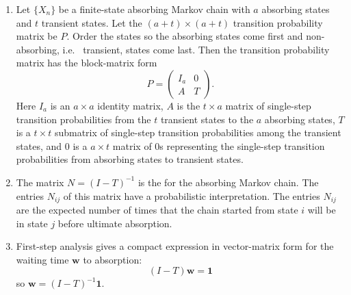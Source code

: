 \documentclass[12pt]{article}
\begin{document}
\begin{enumerate}
    \item
        Let \( \{ X_n \} \) be a finite-state absorbing Markov chain
        with \( a \) absorbing states and \( t \) transient states.  Let
        the \( (a + t) \times (a + t) \) transition probability matrix
        be \( P \).  Order the states so the absorbing states come first
        and non-absorbing, i.e.\ %
        transient, states come last. Then the transition probability
        matrix has the block-matrix form
        \[
            P =
            \begin{pmatrix}
                I_a & 0 \\
                A & T
            \end{pmatrix}
            .
        \] Here \( I_{a} \) is an \( a \times a \) identity matrix, \( A
        \) is the \( t \times a \) matrix of single-step transition
        probabilities from the \( t \) transient states to the \( a \)
        absorbing states, \( T \) is a \( t \times t \) submatrix of
        single-step transition probabilities among the transient states,
        and \( 0 \) is a \( a \times t \) matrix of \( 0 \)s
        representing the single-step transition probabilities from
        absorbing states to transient states.
    \item
        The matrix \( N = (I-T)^{-1} \) is the %
        for the absorbing Markov chain.  The entries \( N_{ij} \) of
        this matrix have a probabilistic interpretation.  The entries \(
        N_{ij} \) are the expected number of times that the chain
        started from state \( i \) will be in state \( j \) before
        ultimate absorption.
    \item
        First-step analysis gives a compact expression in vector-matrix
        form for the waiting time \( \mathbf{w} \) to absorption:
        \[
            (I - T) \mathbf{w} = \mathbf{1}
        \] so \( \mathbf{w} = (I-T)^{-1} \mathbf{1} \).
\end{enumerate}

\hr

\end{document}
